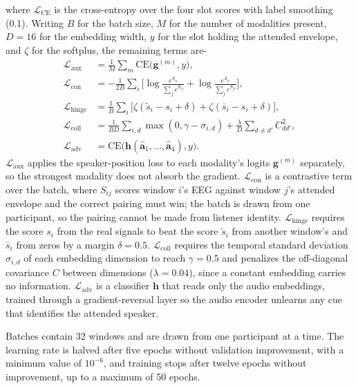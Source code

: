 \documentclass[journal]{IEEEtran}
\begin{document}
where $\mathcal{L}_{\mathrm{CE}}$ is the cross-entropy over the four slot scores with label smoothing (0.1). Writing $B$ for the batch size, $M$ for the number of modalities present, $D=16$ for the embedding width, $y$ for the slot holding the attended envelope, and $\zeta$ for the softplus, the remaining terms are-
\begin{align}
\mathcal{L}_{\mathrm{aux}} &= \tfrac{1}{M}\textstyle\sum_{m}\mathrm{CE}\big(\mathbf{g}^{(m)}, y\big), \\
\mathcal{L}_{\mathrm{con}} &= -\tfrac{1}{2B}\textstyle\sum_{i}\Big[\log\tfrac{e^{S_{ii}}}{\sum_j e^{S_{ij}}} + \log\tfrac{e^{S_{ii}}}{\sum_j e^{S_{ji}}}\Big], \\
\mathcal{L}_{\mathrm{hinge}} &= \tfrac{1}{B}\textstyle\sum_{i}\big[\zeta(\tilde{s}_i - s_i + \delta) + \zeta(\bar{s}_i - s_i + \delta)\big], \\
\mathcal{L}_{\mathrm{coll}} &= \tfrac{1}{BD}\textstyle\sum_{i,d}\max(0,\gamma-\sigma_{i,d}) + \tfrac{\lambda}{D}\textstyle\sum_{d\neq d'} C_{dd'}^{2}, \\
\mathcal{L}_{\mathrm{adv}} &= \mathrm{CE}\big(\mathbf{h}(\hat{\mathbf{a}}_1,\ldots,\hat{\mathbf{a}}_4), y\big).
\end{align}
%
$\mathcal{L}_{\mathrm{aux}}$ applies the speaker-position loss to each modality's logits $\mathbf{g}^{(m)}$ separately, so the strongest modality does not absorb the gradient. $\mathcal{L}_{\mathrm{con}}$ is a contrastive term over the batch, where $S_{ij}$ scores window $i$'s EEG against window $j$'s attended envelope and the correct pairing must win; the batch is drawn from one participant, so the pairing cannot be made from listener identity. $\mathcal{L}_{\mathrm{hinge}}$ requires the score $s_i$ from the real signals to beat the score $\tilde{s}_i$ from another window's and $\bar{s}_i$ from zeros by a margin $\delta=0.5$. $\mathcal{L}_{\mathrm{coll}}$ requires the temporal standard deviation $\sigma_{i,d}$ of each embedding dimension to reach $\gamma=0.5$ and penalizes the off-diagonal covariance $C$ between dimensions ($\lambda=0.04$), since a constant embedding carries no information. $\mathcal{L}_{\mathrm{adv}}$ is a classifier $\mathbf{h}$ that reads only the audio embeddings, trained through a gradient-reversal layer so the audio encoder unlearns any cue that identifies the attended speaker.

Batches contain 32 windows and are drawn from one participant at a time. The learning rate is halved after five epochs without validation improvement, with a minimum value of $10^{-6}$, and training stops after twelve epochs without improvement, up to a maximum of 50 epochs.
\end{document}
